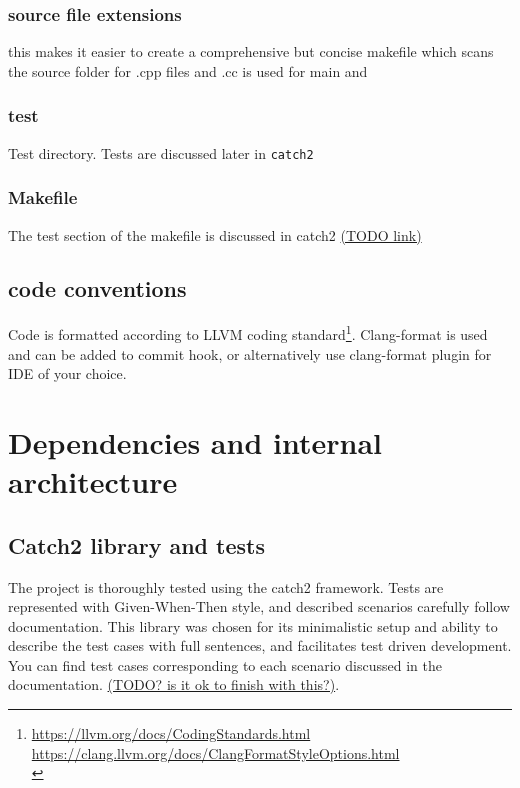 \documentclass{elteikthesis}[2018/06/06]
\begin{document}
\subsubsection{source file extensions}
\label{sec-3-1-1-3}
this makes it easier to create a comprehensive but concise makefile which scans the source folder for .cpp files and .cc is used for main and \\
\subsubsection{test}
\label{sec-3-1-1-4}
Test directory. Tests are discussed later in \texttt{catch2} \\
\subsubsection{Makefile}
\label{sec-3-1-1-5}
The test section of the makefile is discussed in catch2  \uline{(TODO link)} \\
\subsection{code conventions}
\label{sec-3-1-2}
Code is formatted according to LLVM coding standard\footnote{\url{https://llvm.org/docs/CodingStandards.html} \\
\url{https://clang.llvm.org/docs/ClangFormatStyleOptions.html} \\}. Clang-format is used and can be added to commit hook, or alternatively use clang-format plugin for IDE of your choice. \\
\section{Dependencies and internal architecture}
\label{sec-3-2}
\subsection{Catch2 library and tests}
\label{sec-3-2-1}
The project is thoroughly tested using the catch2 framework. Tests are represented with Given-When-Then style, and described scenarios carefully follow documentation. This library was chosen for its minimalistic setup and ability to describe the test cases with full sentences, and facilitates test driven development. You can find test cases corresponding to each scenario discussed in the documentation. \uline{(TODO? is it ok to finish with this?)}. \\
\end{document}

